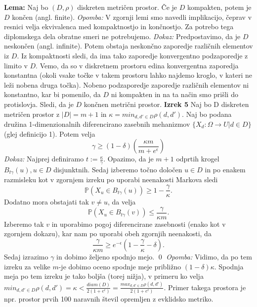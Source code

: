 \documentclass[mat1]{article}
\theoremstyle{definition}
\begin{document}
\newline
\newline
\textbf{Lema: } Naj bo $(D, \rho)$ diskreten metričen prostor. Če je $D$ kompakten, potem je $D$ končen (angl. finite). 
\newline
\newline
\textit{Opomba:} V zgornji lemi smo navedli implikacijo, čeprav v resnici velja ekvivalenca med kompaktnostjo in končnostjo. Za potrebo tega diplomskega dela obratne smeri ne potrebujemo.
\newline
\newline
\textit{Dokaz:} Predpostavimo, da je $D$ neskončen (angl. infinite). Potem obstaja neskončno zaporedje različnih elementov iz $D$. Iz kompaktnosti sledi, da ima tako zaporedje konvergentno podzaporedje z limito v $D$. Vemo, da so v diskretnem prostoru edina konvergentna zaporedja konstantna (okoli vsake točke v takem prostoru lahko najdemo kroglo, v kateri ne leži nobena druga točka). Nobeno podzaporedje zaporedje različnih elementov ni konstantno, kar bi pomenilo, da $D$ ni kompakten in na ta način smo prišli do protislovja. Sledi, da je $D$ končnen metrični prostor.
\newline
\newline
\textbf{Izrek 5} 
Naj bo D diskreten metričen prostor z $|D| = m + 1$ in $\kappa = min_{d,d' \in D}\rho(d,d')$.  Naj bo podana družina 1-dimenzionalnih diferencirano zasebnih mehanizmov $\{ X_d: \Omega \rightarrow U | d \in D\}$ (glej definicijo 1). Potem velja $$\gamma  \geq (1-\delta)(\frac{\kappa m}{m+e^\epsilon})$$
\newline
\newline
\textit{Dokaz:} Najprej definiramo $t := \frac{\kappa}{\gamma}$. Opazimo, da je $m + 1$ odprtih krogel $B_{t\gamma}(u), u \in D$ disjunktnih. Sedaj izberemo točno določen $u \in D$ in po enakem razmisleku kot v zgornjem izreku po uporabi neenakosti Markova sledi $$\mathbb{P}(X_u \in B_{t\gamma}(u)) \geq 1 - \frac{\gamma}{\kappa}.$$
Dodatno mora obstajati tak $v \neq u$, da velja $$\mathbb{P}(X_u \in B_{t\gamma}(v)) \leq \frac{\gamma}{\kappa m}.$$  Izberemo tak $v$ in uporabimo pogoj diferencirane zasebnosti (enako kot v zgornjem dokazu), kar nam po uporabi obeh zgornjih neenakosti, da $$\frac{\gamma}{\kappa m} \geq e^{-\epsilon}(1 - \frac{\gamma}{\kappa} - \delta). $$ Sedaj izrazimo $\gamma$ in dobimo željeno spodnjo mejo.
\newline
\qed
\newline
\newline
\textit{Opomba:} Vidimo, da po tem izreku za velike $m$-je dobimo oceno spodnje meje približno $(1-\delta)\kappa$. Spodnja meja po tem izreku je tako boljša (torej nižja), v primeru ko velja $min_{d,d' \in D}\rho(d,d') = \kappa < \frac{diam(D)}{2(1+e^\epsilon)} =  \frac{max_{d,d' \in D}\rho(d,d')}{2(1+e^\epsilon)}$. Primer takega prostora je npr. prostor prvih 100 naravnih števil opremljen z evklidsko metriko.
\newline
\newline
\end{document}
